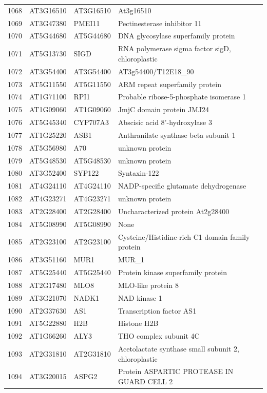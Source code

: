 \documentclass[11pt]{article}
\begin{document}
\begin{center}
\begin{tabular}{rlll}
1068 & AT3G16510 & AT3G16510 & At3g16510\\
1069 & AT3G47380 & PMEI11 & Pectinesterase inhibitor 11\\
1070 & AT5G44680 & AT5G44680 & DNA glycosylase superfamily protein\\
1071 & AT5G13730 & SIGD & RNA polymerase sigma factor sigD, chloroplastic\\
1072 & AT3G54400 & AT3G54400 & AT3g54400/T12E18\_90\\
1073 & AT5G11550 & AT5G11550 & ARM repeat superfamily protein\\
1074 & AT1G71100 & RPI1 & Probable ribose-5-phosphate isomerase 1\\
1075 & AT1G09060 & AT1G09060 & JmjC domain protein JMJ24\\
1076 & AT5G45340 & CYP707A3 & Abscisic acid 8'-hydroxylase 3\\
1077 & AT1G25220 & ASB1 & Anthranilate synthase beta subunit 1\\
1078 & AT5G56980 & A70 & unknown protein\\
1079 & AT5G48530 & AT5G48530 & unknown protein\\
1080 & AT3G52400 & SYP122 & Syntaxin-122\\
1081 & AT4G24110 & AT4G24110 & NADP-specific glutamate dehydrogenase\\
1082 & AT4G23271 & AT4G23271 & unknown protein\\
1083 & AT2G28400 & AT2G28400 & Uncharacterized protein At2g28400\\
1084 & AT5G08990 & AT5G08990 & None\\
1085 & AT2G23100 & AT2G23100 & Cysteine/Histidine-rich C1 domain family protein\\
1086 & AT3G51160 & MUR1 & MUR\_1\\
1087 & AT5G25440 & AT5G25440 & Protein kinase superfamily protein\\
1088 & AT2G17480 & MLO8 & MLO-like protein 8\\
1089 & AT3G21070 & NADK1 & NAD kinase 1\\
1090 & AT2G37630 & AS1 & Transcription factor AS1\\
1091 & AT5G22880 & H2B & Histone H2B\\
1092 & AT1G66260 & ALY3 & THO complex subunit 4C\\
1093 & AT2G31810 & AT2G31810 & Acetolactate synthase small subunit 2, chloroplastic\\
1094 & AT3G20015 & ASPG2 & Protein ASPARTIC PROTEASE IN GUARD CELL 2\\

\end{tabular}
\end{center}
\end{document}
